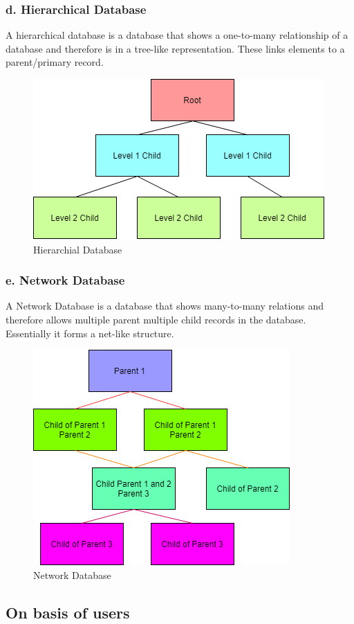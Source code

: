 \documentclass[BTech]{srmuthesis}
\begin{document}
\subsubsection{d. Hierarchical Database}
A hierarchical database is a database that shows a one-to-many relationship of a database and therefore is in a tree-like representation. These links elements to a parent/primary record.
\begin{figure}[h!]
	\centering
	\includegraphics[scale=0.7]{HierarchialDB.png}
	\caption{Hierarchial Database}
\end{figure}
\subsubsection{e. Network Database}
A Network Database is a database that shows many-to-many relations and therefore allows multiple parent multiple child records in the database. Essentially it forms a net-like structure.
\begin{figure}[h!]
	\centering
	\includegraphics[scale=0.7]{NetworkDB.png}
	\caption{Network Database}
\end{figure}
\subsection{On basis of users}
\end{document}
